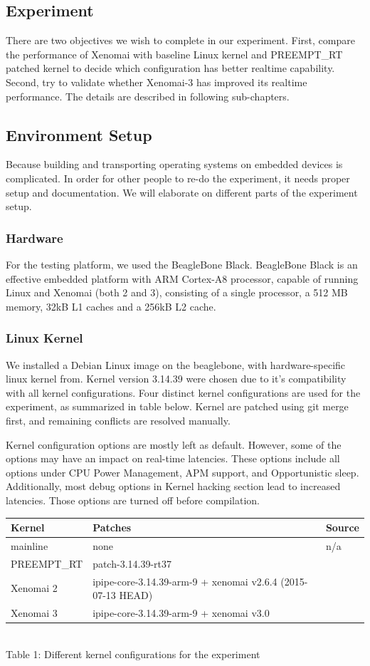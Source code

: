 \documentclass[10pt,a4paper]{article}
\begin{document}
\begin{multicols}{2}
\section{Experiment}
There are two objectives we wish to complete in our experiment. First, compare the performance of Xenomai with baseline Linux kernel and PREEMPT\_RT patched kernel to decide which configuration has better realtime capability. Second, try to validate whether Xenomai-3 has improved its realtime performance. The details are described in following sub-chapters. 
\subsection{Environment Setup}
Because building and transporting operating systems on embedded devices is complicated. In order for other people to re-do the experiment, it needs proper setup and documentation. We will elaborate on different parts of the experiment setup. 
\subsubsection{Hardware}
For the testing platform, we used the BeagleBone Black. BeagleBone Black is an effective embedded platform with ARM Cortex-A8 processor, capable of running Linux and Xenomai (both 2 and 3), consisting of a single processor, a 512 MB memory, 32kB L1 caches and a 256kB L2 cache.  
\subsubsection{Linux Kernel}
We installed a Debian Linux image\cite{debian} on the beaglebone, with hardware-specific linux kernel from\cite{kernel}. Kernel version 3.14.39 were chosen due to it's compatibility with all kernel configurations.
Four distinct kernel configurations are used for the experiment, as summarized in table below. Kernel are patched using git merge first, and remaining conflicts are resolved manually.

Kernel conﬁguration options are mostly left as default. However, some of the options may have an impact on real-time latencies. These options include all options under CPU Power Management, APM support, and Opportunistic sleep. Additionally, most debug options in Kernel hacking section lead to increased latencies. Those options are turned off before compilation.

\begin{tabular}{|l| p{3cm} |l|}
\hline
Kernel & Patches & Source\\ \hline
mainline   & none & n/a \\ \hline
PREEMPT\_RT & patch-3.14.39-rt37 & \cite{p-rt} \\ \hline
Xenomai 2  & ipipe-core-3.14.39-arm-9 + xenomai v2.6.4 (2015-07-13 HEAD) & \cite{p-ipipe} \cite{git-x2.6} \\ \hline
Xenomai 3  & ipipe-core-3.14.39-arm-9 + xenomai v3.0  & \cite{p-ipipe} \cite{git-x3} \\ \hline
\end{tabular}\\
Table 1: Different kernel configurations for the experiment\\

\end{multicols}
\end{document}
